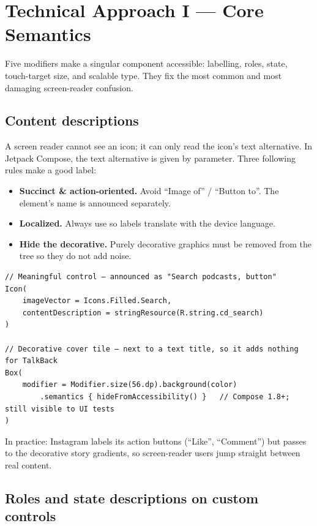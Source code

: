 \section{Technical Approach I --- Core Semantics}
\label{sec:core}

Five modifiers make a singular component accessible: labelling, roles, state, touch-target size, and
scalable type. They fix the most common and most damaging screen-reader confusion.

\subsection{Content descriptions}

A screen reader cannot see an icon; it can only read the icon's text alternative. In Jetpack Compose, the
text alternative is given by  parameter. Three following rules make a good label:

\begin{itemize}[leftmargin=1.4em]
	\item \textbf{Succinct \& action-oriented.} Avoid ``Image of'' / ``Button to''. The element's name is
	      announced separately.
	\item \textbf{Localized.} Always use  so labels translate with the device
	      language.
	\item \textbf{Hide the decorative.} Purely decorative graphics must be removed from the tree so
	      they do not add noise.
\end{itemize}

\begin{lstlisting}[caption={Meaningful icons get a localized label; decorative art is hidden.},captionpos=b]
// Meaningful control — announced as "Search podcasts, button"
Icon(
    imageVector = Icons.Filled.Search,
    contentDescription = stringResource(R.string.cd_search)
)

// Decorative cover tile — next to a text title, so it adds nothing for TalkBack
Box(
    modifier = Modifier.size(56.dp).background(color)
        .semantics { hideFromAccessibility() }   // Compose 1.8+; still visible to UI tests
)
\end{lstlisting}

In practice: Instagram labels its action buttons (``Like'', ``Comment'') but passes  to
the decorative story gradients, so screen-reader users jump straight between real content.

\subsection{Roles and state descriptions on custom controls}


